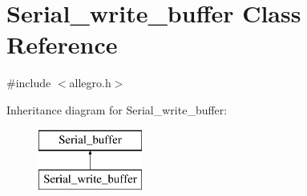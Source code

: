 \hypertarget{class_serial__write__buffer}{}\section{Serial\+\_\+write\+\_\+buffer Class Reference}
\label{class_serial__write__buffer}


{\ttfamily \#include $<$allegro.\+h$>$}

Inheritance diagram for Serial\+\_\+write\+\_\+buffer\+:\begin{figure}[H]
\begin{center}
\leavevmode
\includegraphics[height=2.000000cm]{class_serial__write__buffer}
\end{center}
\end{figure}
